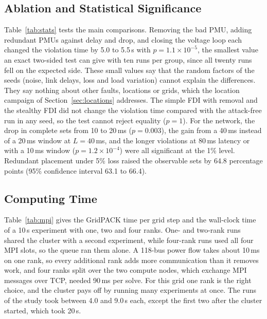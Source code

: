 \documentclass[journal]{IEEEtran}
\begin{document}
\subsection{Ablation and Statistical Significance}



Table~\ref{tab:stats} tests the main comparisons. Removing the bad PMU, adding redundant PMUs against delay and drop, and closing the voltage loop each changed the violation time by 5.0 to 5.5\,s with $p = 1.1\times10^{-5}$, the smallest value an exact two-sided test can give with ten runs per group, since all twenty runs fell on the expected side. These small values say that the random factors of the seeds (noise, link delays, loss and load variation) cannot explain the differences. They say nothing about other faults, locations or grids, which the location campaign of Section~\ref{sec:locations} addresses. The simple FDI with removal and the stealthy FDI did not change the violation time compared with the attack-free run in any seed, so the test cannot reject equality ($p = 1$). For the network, the drop in complete sets from 10 to 20\,ms ($p = 0.003$), the gain from a 40\,ms instead of a 20\,ms window at $L = 40$\,ms, and the longer violations at 80\,ms latency or with a 10\,ms window ($p = 1.2\times10^{-4}$) were all significant at the 1\% level. Redundant placement under 5\% loss raised the observable sets by 64.8 percentage points (95\% confidence interval 63.1 to 66.4).

\subsection{Computing Time}
\label{sec:compute}




Table~\ref{tab:mpi} gives the GridPACK time per grid step and the wall-clock time of a 10\,s experiment with one, two and four ranks. One- and two-rank runs shared the cluster with a second experiment, while four-rank runs used all four MPI slots, so the queue ran them alone. A 118-bus power flow takes about 10\,ms on one rank, so every additional rank adds more communication than it removes work, and four ranks split over the two compute nodes, which exchange MPI messages over TCP, needed 90\,ms per solve. For this grid one rank is the right choice, and the cluster pays off by running many experiments at once. The runs of the study took between 4.0 and 9.0\,s each, except the first two after the cluster started, which took 20\,s.
\end{document}
